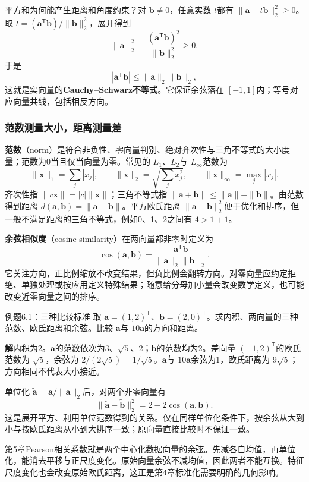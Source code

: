 \documentclass[UTF8,fontset=none,zihao=-4,a4paper]{ctexart}
\newcommand{\term}[1]{\textbf{#1}}
\newcommand{\sol}{\par\noindent\textbf{解}\quad}
\numberwithin{equation}{section}
\numberwithin{figure}{section}
\begin{document}
平方和为何能产生距离和角度约束？对 $\symbf b\ne0$，任意实数 $t$都有 $\|\symbf a-t\symbf b\|_2^2\ge0$。取 $t=(\symbf a^{\mathsf T}\symbf b)/\|\symbf b\|_2^2$，展开得到
\[
 \|\symbf a\|_2^2-\frac{(\symbf a^{\mathsf T}\symbf b)^2}{\|\symbf b\|_2^2}\ge0.
\]
于是
\[
 |\symbf a^{\mathsf T}\symbf b|\le\|\symbf a\|_2\|\symbf b\|_2,
\]
这就是实向量的\term{Cauchy--Schwarz不等式}。它保证余弦落在 $[-1,1]$内；等号对应向量共线，包括相反方向。

\subsubsection{范数测量大小，距离测量差}
\term{范数}（norm）是符合非负性、零向量判别、绝对齐次性与三角不等式的大小度量；范数为0当且仅当向量为零。常见的 $L_1$、$L_2$与 $L_\infty$范数为
\[
 \|\symbf x\|_1=\sum_j|x_j|,\qquad
 \|\symbf x\|_2=\sqrt{\sum_jx_j^2},\qquad
 \|\symbf x\|_\infty=\max_j|x_j|.
\]
齐次性指 $\|c\symbf x\|=|c|\|\symbf x\|$；三角不等式指 $\|\symbf a+\symbf b\|\le\|\symbf a\|+\|\symbf b\|$。由范数得到距离 $d(\symbf a,\symbf b)=\|\symbf a-\symbf b\|$。平方欧氏距离 $\|\symbf a-\symbf b\|_2^2$便于优化和排序，但一般不满足距离的三角不等式，例如0、1、2之间有 $4>1+1$。

\term{余弦相似度}（cosine similarity）在两向量都非零时定义为
\[
 \operatorname{cos}(\symbf a,\symbf b)=
 \frac{\symbf a^{\mathsf T}\symbf b}{\|\symbf a\|_2\|\symbf b\|_2}.
\]
它关注方向，正比例缩放不改变结果，但负比例会翻转方向。对零向量应约定拒绝、单独处理或按应用定义特殊结果；随意给分母加小量会改变数学定义，也可能改变近零向量之间的排序。

\begin{infobox}{例题6.1：三种比较标准}
取 $\symbf a=(1,2)^{\mathsf T}$、$\symbf b=(2,0)^{\mathsf T}$。求内积、两向量的三种范数、欧氏距离和余弦。比较 $\symbf a$与 $10\symbf a$的方向和距离。
\end{infobox}
\sol 内积为2。$\symbf a$的范数依次为3、$\sqrt5$、2；$\symbf b$的范数均为2。差向量 $(-1,2)^{\mathsf T}$的欧氏范数为 $\sqrt5$，余弦为 $2/(2\sqrt5)=1/\sqrt5$。$\symbf a$与 $10\symbf a$余弦为1，欧氏距离为 $9\sqrt5$；方向相同不代表大小接近。

单位化 $\widetilde{\symbf a}=\symbf a/\|\symbf a\|_2$后，对两个非零向量有
\[
 \|\widetilde{\symbf a}-\widetilde{\symbf b}\|_2^2
 =2-2\operatorname{cos}(\symbf a,\symbf b).
\]
这是展开平方、利用单位范数得到的关系。仅在同样单位化条件下，按余弦从大到小与按欧氏距离从小到大排序一致；原向量直接比较时不保证一致。

第5章Pearson相关系数就是两个中心化数据向量的余弦。先减各自均值，再单位化，能消去平移与正尺度变化。原始向量余弦不减均值，因此两者不能互换。特征尺度变化也会改变原始欧氏距离，这正是第4章标准化需要明确的几何影响。
\end{document}
